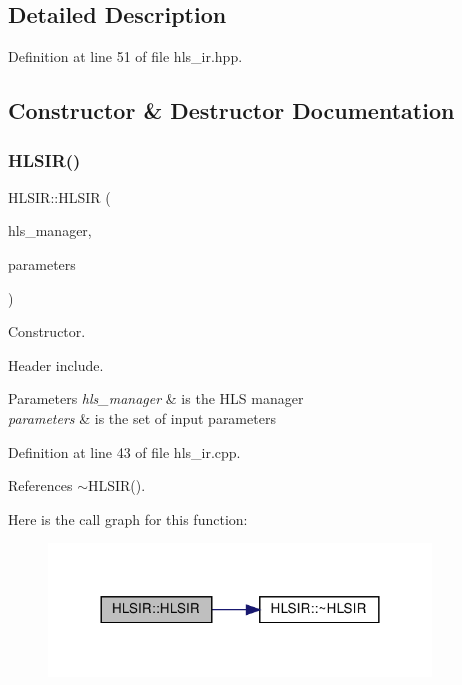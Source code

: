 \subsection{Detailed Description}


Definition at line 51 of file hls\+\_\+ir.\+hpp.



\subsection{Constructor \& Destructor Documentation}
\mbox{\label{classHLSIR_a5a2ee90d58d5a7653315ed9bd40b9d45}} 
\subsubsection{\texorpdfstring{H\+L\+S\+I\+R()}{HLSIR()}}
{\footnotesize\ttfamily H\+L\+S\+I\+R\+::\+H\+L\+S\+IR (\begin{DoxyParamCaption}\item[{const \hyperlink{hls__manager_8hpp_acd3842b8589fe52c08fc0b2fcc813bfe}{H\+L\+S\+\_\+manager\+Ref} \&}]{hls\+\_\+manager,  }\item[{const \hyperlink{Parameter_8hpp_a37841774a6fcb479b597fdf8955eb4ea}{Parameter\+Const\+Ref} \&}]{parameters }\end{DoxyParamCaption})}



Constructor. 

Header include.


\begin{DoxyParams}{Parameters}
{\em hls\+\_\+manager} & is the H\+LS manager \\
\hline
{\em parameters} & is the set of input parameters \\
\hline
\end{DoxyParams}


Definition at line 43 of file hls\+\_\+ir.\+cpp.



References $\sim$\+H\+L\+S\+I\+R().

Here is the call graph for this function\+:
\nopagebreak
\begin{figure}[H]
\begin{center}
\leavevmode
\includegraphics[width=288pt]{d0/d25/classHLSIR_a5a2ee90d58d5a7653315ed9bd40b9d45_cgraph}
\end{center}
\end{figure}
\mbox{\label{classHLSIR_ae33f6261c9be10dc90ba34969ca64911}} 
